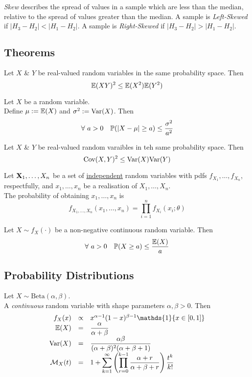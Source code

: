 \documentclass[11pt,a4paper]{article}
\begin{document}
\textit{Skew} describes the spread of values in a sample which are less than the median, relative to the spread of values greater than the median. A sample is \textit{Left-Skewed} if $|H_3-H_2|<|H_1-H_2|$. A sample is \textit{Right-Skewed} if $|H_3-H_2|>|H_1-H_2|$.\\

\subsection{Theorems}

Let $X$ \& $Y$ be real-valued random variables in the same probability space. Then
$$\mathbb{E}(XY)^2\leq\mathbb{E}(X^2)\mathbb{E}(Y^2)$$

Let $X$ be a random variable.\\
Define $\mu:=\mathbb{E}(X)$ and $\sigma^2:=\mathrm{Var}(X)$. Then
$$\forall\ a>0\quad\mathbb{P}(|X-\mu|\geq a)\leq\frac{\sigma^2}{a^2}$$

Let $X$ \& $Y$ be real-valued random varaibles in teh same probability space. Then
$$\mathrm{Cov}(X,Y)^2\leq\mathrm{Var}(X)\mathrm{Var}(Y)$$

Let $\textbf{X}_1,\dots,X_n$ be a set of \underline{independent} random variables with pdfs $f_{X_1},\dots,f_{X_n}$, respectfully, and $x_1,\dots,x_n$ be a realisation of $X_1,\dots,X_n$.\\
The probability of obtaining $x_1,\dots,x_n$ is
$$f_{X_1,\dots,X_n}(x_1,\dots,x_n)=\prod_{i=1}^nf_{X_i}(x_i;\theta)$$

Let $X\sim f_X(\cdot)$ be a non-negative continuous random variable. Then
$$\forall\ a>0\quad\mathbb{P}(X\geq a)\leq\frac{\mathbb{E}(X)}{a}$$

\subsection{Probability Distributions}

Let $X\sim\text{Beta}(\alpha,\beta)$.\\
A \textit{continuous} random variable with shape parameters $\alpha,\beta>0$. Then
\[\begin{array}{rcl}
f_X(x)&\propto&x^{\alpha-1}(1-x)^{\beta-1}\mathds{1}\{x\in[0,1]\}\\
\expect(X)&=&\dfrac{\alpha}{\alpha+\beta}\\
\var(X)&=&\dfrac{\alpha\beta}{(\alpha+\beta)^2(\alpha+\beta+1)}\\
\mathcal{M}_X(t)&=&1+{\displaystyle\sum_{k=1}^\infty\left(\prod_{r=0}^{k-1}\dfrac{\alpha+r}{\alpha+\beta+r}\right)\dfrac{t^k}{k!}}
\end{array}\]
\end{document}
